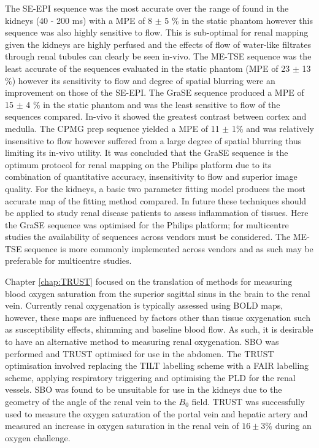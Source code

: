 The \ac{SE}-\ac{EPI} sequence was the most accurate over the range of \ttwo found in the kidneys (40 - 200 ms) with a \ac{MPE} of 8 $\pm$ 5 \% in the static phantom however this sequence was also highly sensitive to flow. This is sub-optimal for renal \ttwo mapping given the kidneys are highly perfused and the effects of flow of water-like filtrates through renal tubules can clearly be seen in-vivo. The \ac{ME-TSE} sequence was the least accurate of the sequences evaluated in the static phantom (\ac{MPE} of 23 $\pm$ 13 \%) however its sensitivity to flow and degree of spatial blurring were an improvement on those of the \ac{SE}-\ac{EPI}. The \ac{GraSE} sequence produced a \ac{MPE} of 15 $\pm$ 4 \% in the static phantom and was the least sensitive to flow of the sequences compared. In-vivo it showed the greatest contrast between cortex and medulla. The \ac{CPMG} \ttwo prep sequence yielded a \ac{MPE} of 11 $\pm$ 1\% and was relatively insensitive to flow however suffered from a large degree of spatial blurring thus limiting its in-vivo utility. It was concluded that the \ac{GraSE} sequence is the optimum protocol for renal \ttwo mapping on the Philips platform due to its combination of quantitative accuracy, insensitivity to flow and superior image quality. For the kidneys, a basic two parameter fitting model produces the most accurate \ttwo map of the fitting method compared. In future these techniques should be applied to study renal disease patients to assess inflammation of tissues. Here the \ac{GraSE} sequence was optimised for the Philips platform; for multicentre studies the availability of sequences across vendors must be considered. The \ac{ME-TSE} sequence is more commonly implemented across vendors and as such may be preferable for multicentre studies.

Chapter \ref{chap:TRUST} focused on the translation of methods for measuring blood oxygen saturation from the superior sagittal sinus in the brain to the renal vein. Currently renal oxygenation is typically assessed using \ac{BOLD} \ttwostar maps, however, these maps are influenced by factors other than tissue oxygenation such as susceptibility effects, shimming and baseline blood flow. As such, it is desirable to have an alternative method to measuring renal oxygenation. \ac{SBO} was performed and \ac{TRUST} optimised for use in the abdomen. The \ac{TRUST} optimisation involved replacing the \ac{TILT} labelling scheme with a \ac{FAIR} labelling scheme, applying respiratory triggering and optimising the \ac{PLD} for the renal vessels. \ac{SBO} was found to be unsuitable for use in the kidneys due to the geometry of the angle of the renal vein to the $B_0$ field. \ac{TRUST} was successfully used to measure the oxygen saturation of the portal vein and hepatic artery and measured an increase in oxygen saturation in the renal vein of $16 \pm 3 \%$ during an oxygen challenge.

